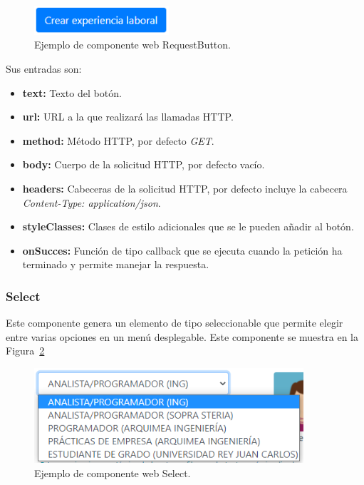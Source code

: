 \documentclass[a4paper, 12pt]{book}
\begin{document}
\begin{figure}
  \centering
  \includegraphics[width=5cm, keepaspectratio]{img/RequestButton.PNG}
  \caption{Ejemplo de componente web RequestButton.}\label{fig:component_request_button}
\end{figure}

Sus entradas son:

		\begin{itemize}
		\item \textbf{text:} Texto del botón.
		\item \textbf{url:} URL a la que realizará las llamadas HTTP.
		\item \textbf{method:} Método HTTP, por defecto \emph{GET}.
		\item \textbf{body:} Cuerpo de la solicitud HTTP, por defecto vacío.
		\item \textbf{headers:} Cabeceras de la solicitud HTTP, por defecto incluye la cabecera \emph{Content-Type: application/json}.
		\item \textbf{styleClasses:} Clases de estilo adicionales que se le pueden añadir al botón.
		\item \textbf{onSucces:} Función de tipo callback que se ejecuta cuando la petición ha terminado y permite manejar la respuesta.
		\end{itemize}


\subsubsection{Select}
\label{subsec:wc_select}
Este componente genera un elemento de tipo seleccionable que permite elegir entre varias opciones en un menú desplegable.
Este componente se muestra en la Figura~\ref{fig:component_select}

\begin{figure}
  \centering
  \includegraphics[width=10cm, keepaspectratio]{img/Select.PNG}
  \caption{Ejemplo de componente web Select.}\label{fig:component_select}
\end{figure}
\end{document}
